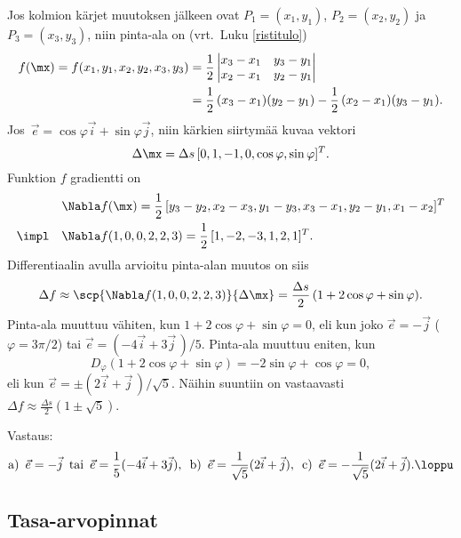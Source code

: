 \ratk Jos kolmion kärjet muutoksen jälkeen ovat $P_1=(x_1,y_1)$, $P_2=(x_2,y_2)$ ja 
$P_3=(x_3,y_3)$, niin pinta-ala on (vrt.\ Luku \ref{ristitulo})
\begin{align*}
f(\mx)=f(x_1,y_1,x_2,y_2,x_3,y_3) 
    &= \frac{1}{2}\begin{vmatrix} x_3-x_1 & y_3-y_1 \\ x_2-x_1 & y_2-y_1 \end{vmatrix} \\ 
    &= \frac{1}{2}\,(x_3-x_1)(y_2-y_1)-\frac{1}{2}\,(x_2-x_1)(y_3-y_1).
\end{align*}
Jos $\,\vec e = \cos\varphi\vec i + \sin\varphi\vec j$, niin kärkien siirtymää kuvaa vektori
\[
\Delta \mx = \Delta s\,[0,1,-1,0,\cos\varphi,\sin\varphi]^T.
\]
Funktion $f$ gradientti on
\begin{align*}
           &\Nabla f(\mx) = \frac{1}{2}\,[y_3-y_2,x_2-x_3,y_1-y_3,x_3-x_1,y_2-y_1,x_1-x_2]^T \\
\impl\quad &\Nabla f(1,0,0,2,2,3) = \frac{1}{2}\,[1,-2,-3,1,2,1]^T.
\end{align*}
Differentiaalin avulla arvioitu pinta-alan muutos on siis
\[
\Delta f \approx \scp{\Nabla f(1,0,0,2,2,3)}{\Delta\mx} 
         = \frac{\Delta s}{2}\,(1+2\cos\varphi+\sin\varphi).
\]
Pinta-ala muuttuu vähiten, kun $1+2\cos\varphi+\sin\varphi=0$, eli kun joko $\vec e=-\vec j$
($\varphi=3\pi/2$) tai $\vec e=(-4\vec i+3\vec j\,)/5$. Pinta-ala muuttuu eniten, kun 
\[
D_\varphi(1+2\cos\varphi+\sin\varphi)=-2\sin\varphi+\cos\varphi=0,
\]
eli kun $\vec e=\pm(2\vec i + \vec j\,)/\sqrt{5}$. Näihin suuntiin on vastaavasti
$\Delta f \approx \frac{\Delta s}{2}(1\pm\sqrt{5})$.

Vastaus:
\[
\text{a)}\,\ \vec e = -\vec j\,\ \text{tai}\,\ \vec e = \frac{1}{5}(-4\vec i+3\vec j), \,\
\text{b)}\,\ \vec e = \frac{1}{\sqrt{5}}(2\vec i + \vec j), \,\
\text{c)}\,\ \vec e = -\frac{1}{\sqrt{5}}(2\vec i + \vec j). \loppu
\]

\subsection{Tasa-arvopinnat}

